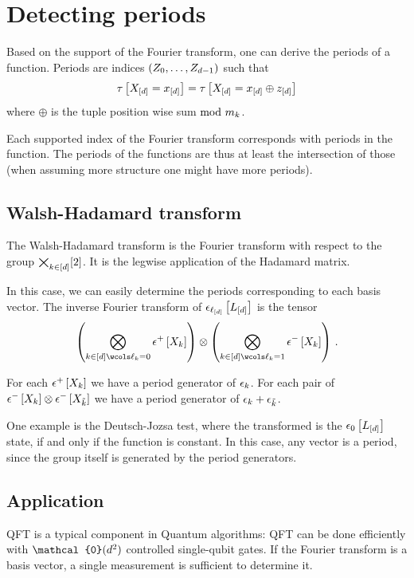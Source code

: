 \section{Detecting periods}

Based on the support of the Fourier transform, one can derive the periods of a function.
Periods are indices $(Z_{0},\ldots,Z_{d-1})$ such that
\begin{align*}
    \tau\left[X_{[d]}=x_{[d]}\right]
    = \tau\left[X_{[d]}=x_{[d]}\oplus z_{[d]}\right]
\end{align*}
where $\oplus$ is the tuple position wise sum $\mathrm{mod}\,\,m_{k}$.


Each supported index of the Fourier transform corresponds with periods in the function.
The periods of the functions are thus at least the intersection of those (when assuming more structure one might have more periods).

\subsection{Walsh-Hadamard transform}

The Walsh-Hadamard transform is the Fourier transform with respect to the group $\bigtimes_{k\in[d]}[2]$.
It is the legwise application of the Hadamard matrix.

In this case, we can easily determine the periods corresponding to each basis vector.
The inverse Fourier transform of $\epsilon_{\ell_{[d]}}\left[L_{[d]}\right]$ is the tensor
\begin{align*}
    \left(\bigotimes_{\catenumeratorin \wcols \selindexof{\catenumerator}=0} \hplusbasat{\catvariableof{\catenumerator}} \right)
    \otimes
    \left(\bigotimes_{\catenumeratorin \wcols \selindexof{\catenumerator}=1} \hminusbasat{\catvariableof{\catenumerator}} \right) \, .
\end{align*}

For each $\epsilon^{+}\left[X_{k}\right]$ we have a period generator of $\epsilon_{k}$.
For each pair of $\epsilon^{-}\left[X_{k}\right]\otimes \epsilon^{-}\left[X_{\tilde{k}}\right]$ we have a period generator of $\epsilon_{k}+\epsilon_{\tilde{k}}$.

One example is the Deutsch-Jozsa test, where the transformed is the $\epsilon_{0}\left[L_{[d]}\right]$ state, if and only if the function is constant.
In this case, any vector is a period, since the group itself is generated by the period generators.

\subsection{Application}

QFT is a typical component in Quantum algorithms: QFT can be done efficiently with $\mathcal{0}(\catorder^2)$ controlled single-qubit gates.
If the Fourier transform is a basis vector, a single measurement is sufficient to determine it.